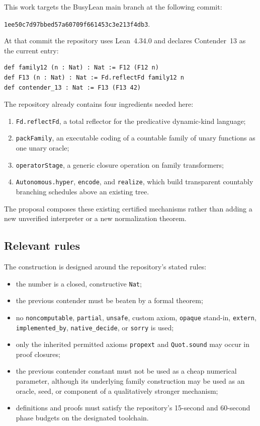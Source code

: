 \documentclass[11pt]{article}
\theoremstyle{definition}
\theoremstyle{remark}
\newcommand{\lean}[1]{\texttt{#1}}
\begin{document}
This work targets the BusyLean main branch at the following commit:
\begin{center}
\texttt{\small 1ee50c7d97bbed57a60709f661453c3e213f4db3}.
\end{center}
At that commit the repository uses Lean~4.34.0 and declares Contender~13 as the
current entry:

\begin{lstlisting}
def family12 (n : Nat) : Nat := F12 (F12 n)
def F13 (n : Nat) : Nat := Fd.reflectFd family12 n
def contender_13 : Nat := F13 (F13 42)
\end{lstlisting}

The repository already contains four ingredients needed here:

\begin{enumerate}[leftmargin=*]
\item \lean{Fd.reflectFd}, a total reflector for the predicative dynamic-kind
  language;
\item \lean{packFamily}, an executable coding of a countable family of unary
  functions as one unary oracle;
\item \lean{operatorStage}, a generic closure operation on family
  transformers;
\item \lean{Autonomous.hyper}, \lean{encode}, and \lean{realize}, which build
  transparent countably branching schedules above an existing tree.
\end{enumerate}

The proposal composes these existing certified mechanisms rather than adding a
new unverified interpreter or a new normalization theorem.

\subsection{Relevant rules}

The construction is designed around the repository's stated rules:

\begin{itemize}[leftmargin=*]
\item the number is a closed, constructive \lean{Nat};
\item the previous contender must be beaten by a formal theorem;
\item no \lean{noncomputable}, \lean{partial}, \lean{unsafe}, custom axiom,
  \lean{opaque} stand-in, \lean{extern}, \lean{implemented\_by},
  \lean{native\_decide}, or \lean{sorry} is used;
\item only the inherited permitted axioms \lean{propext} and
  \lean{Quot.sound} may occur in proof closures;
\item the previous contender constant must not be used as a cheap numerical
  parameter, although its underlying family construction may be used as an
  oracle, seed, or component of a qualitatively stronger mechanism;
\item definitions and proofs must satisfy the repository's 15-second and
  60-second phase budgets on the designated toolchain.
\end{itemize}
\end{document}
